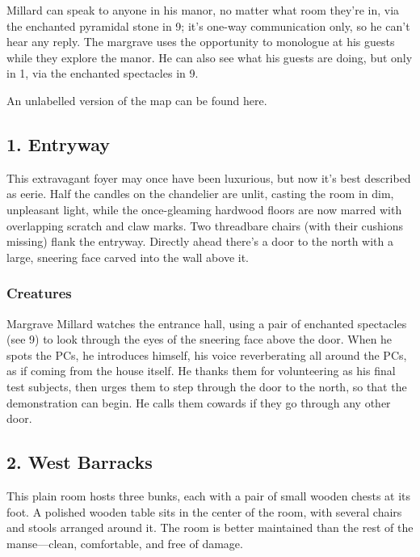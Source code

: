 \documentclass[10pt,a4paper,twoside,bg=print,twocolumn,openany,nodeprecatedcode]{dndbook}
\begin{document}
Millard can speak to anyone in his manor, no matter what room they're in, via the enchanted pyramidal stone in 9; it's one-way communication only, so he can't hear any reply. The margrave uses the opportunity to monologue at his guests while they explore the manor. He can also see what his guests are doing, but only in 1, via the enchanted spectacles in 9.

An unlabelled version of the map can be found here.

\subsection{1. Entryway}
\begin{DndReadAloud}{}
This extravagant foyer may once have been luxurious, but now it's best described as eerie. Half the candles on the chandelier are unlit, casting the room in dim, unpleasant light, while the once-gleaming hardwood floors are now marred with overlapping scratch and claw marks. Two threadbare chairs (with their cushions missing) flank the entryway. Directly ahead there's a door to the north with a large, sneering face carved into the wall above it.

\end{DndReadAloud}

\subsubsection{Creatures}
Margrave Millard watches the entrance hall, using a pair of enchanted spectacles (see 9) to look through the eyes of the sneering face above the door. When he spots the PCs, he introduces himself, his voice reverberating all around the PCs, as if coming from the house itself. He thanks them for volunteering as his final test subjects, then urges them to step through the door to the north, so that the demonstration can begin. He calls them cowards if they go through any other door.

\subsection{2. West Barracks}
\begin{DndReadAloud}{}
This plain room hosts three bunks, each with a pair of small wooden chests at its foot. A polished wooden table sits in the center of the room, with several chairs and stools arranged around it. The room is better maintained than the rest of the manse—clean, comfortable, and free of damage.

\end{DndReadAloud}
\end{document}
